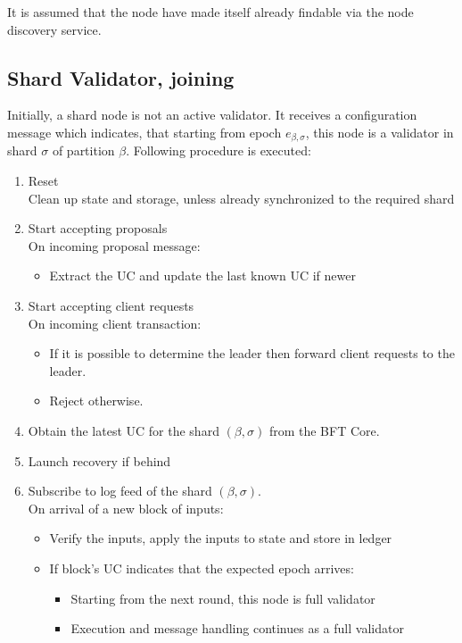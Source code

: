It is assumed that the node have made itself already findable via the node discovery service.

\subsection{Shard Validator, joining} \label{sec:shard-node-joining}

Initially, a shard node is not an active validator. It receives a configuration message which indicates, that starting from epoch $e_{\beta, \sigma}$, this node is a validator in shard $\sigma$ of partition $\beta$. Following procedure is executed:

\begin{shaded}
  \begin{enumerate}[nosep]
    \item Reset \\
          Clean up state and storage, unless already synchronized to the required shard
    \item Start accepting proposals \\
          On incoming proposal message:
          \begin{itemize}[nosep]
            \item Extract the UC and update the last known UC if newer
          \end{itemize}
    \item Start accepting client requests \\
          On incoming client transaction:
          \begin{itemize}[nosep]
            \item If it is possible to determine the leader then forward client requests to the leader.
            \item Reject otherwise.
          \end{itemize}
    \item Obtain the latest UC for the shard $(\beta, \sigma)$ from the BFT Core.
    \item Launch recovery if behind
    \item Subscribe to log feed of the shard $(\beta, \sigma)$.\\
          On arrival of a new block of inputs:
          \begin{itemize}[nosep]
            \item Verify the inputs, apply the inputs to state and store in ledger
            \item If block's UC indicates that the expected epoch arrives:
            \begin{itemize}[nosep]
                \item Starting from the next round, this node is full validator
                \item Execution and message handling continues as a full validator
            \end{itemize}
          \end{itemize}
  \end{enumerate}
\end{shaded}

